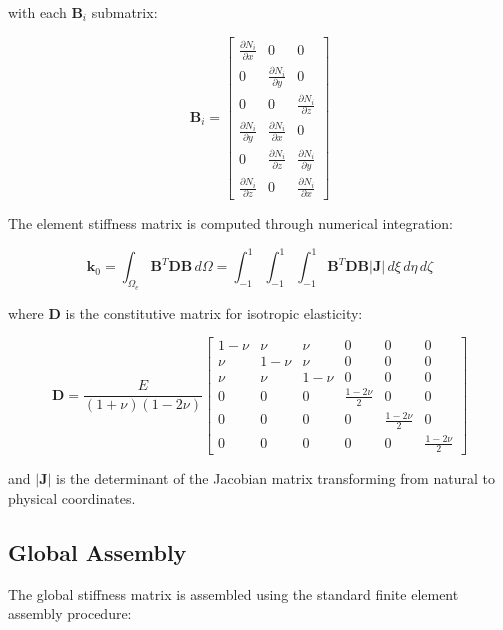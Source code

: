 \documentclass[11pt]{report}
\newcommand{\matr}[1]{\mathbf{#1}}
\newcommand{\domain}{\Omega}
\newcommand{\youngs}{E}
\newcommand{\elemstiff}{\matr{k}_0}
\begin{document}
with each $\matr{B}_i$ submatrix:

\begin{equation}
\matr{B}_i = \begin{bmatrix}
\frac{\partial N_i}{\partial x} & 0 & 0 \\
0 & \frac{\partial N_i}{\partial y} & 0 \\
0 & 0 & \frac{\partial N_i}{\partial z} \\
\frac{\partial N_i}{\partial y} & \frac{\partial N_i}{\partial x} & 0 \\
0 & \frac{\partial N_i}{\partial z} & \frac{\partial N_i}{\partial y} \\
\frac{\partial N_i}{\partial z} & 0 & \frac{\partial N_i}{\partial x}
\end{bmatrix}
\end{equation}

The element stiffness matrix is computed through numerical integration:

\begin{equation}
\elemstiff = \int_{\domain_e} \matr{B}^T \matr{D} \matr{B} \, d\domain = \int_{-1}^{1} \int_{-1}^{1} \int_{-1}^{1} \matr{B}^T \matr{D} \matr{B} |\matr{J}| \, d\xi \, d\eta \, d\zeta
\end{equation}

where $\matr{D}$ is the constitutive matrix for isotropic elasticity:

\begin{equation}
\matr{D} = \frac{\youngs}{(1+\nu)(1-2\nu)} \begin{bmatrix}
1-\nu & \nu & \nu & 0 & 0 & 0 \\
\nu & 1-\nu & \nu & 0 & 0 & 0 \\
\nu & \nu & 1-\nu & 0 & 0 & 0 \\
0 & 0 & 0 & \frac{1-2\nu}{2} & 0 & 0 \\
0 & 0 & 0 & 0 & \frac{1-2\nu}{2} & 0 \\
0 & 0 & 0 & 0 & 0 & \frac{1-2\nu}{2}
\end{bmatrix}
\end{equation}

and $|\matr{J}|$ is the determinant of the Jacobian matrix transforming from natural to physical coordinates.

\subsection{Global Assembly}
The global stiffness matrix is assembled using the standard finite element assembly procedure:
\end{document}
